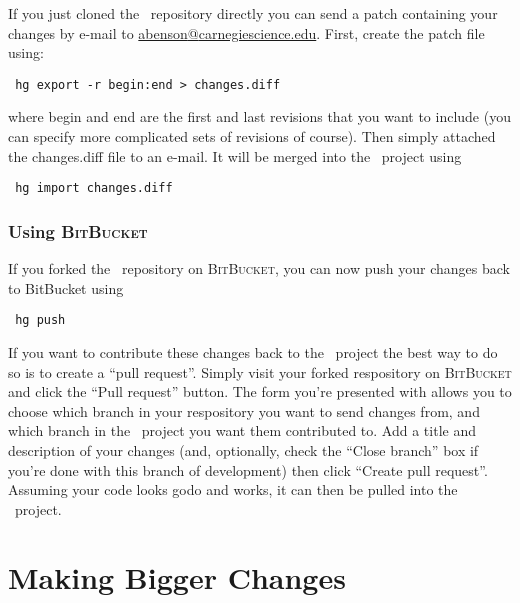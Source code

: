 If you just cloned the \glc\ repository directly you can send a patch containing your changes by e-mail to \href{mailto:abenson@carnegiescience.edu}{abenson{@}carnegiescience.edu}. First, create the patch file using:
\begin{verbatim}
 hg export -r begin:end > changes.diff
\end{verbatim}
where {\normalfont \ttfamily begin} and {\normalfont \ttfamily end} are the first and last revisions that you want to include (you can specify more complicated sets of revisions of course). Then simply attached the {\normalfont \ttfamily changes.diff} file to an e-mail. It will be merged into the \glc\ project using
\begin{verbatim}
 hg import changes.diff
\end{verbatim}

\subsubsection{Using {\normalfont \scshape BitBucket}}

If you forked the \glc\ repository on {\normalfont \scshape BitBucket}, you can now push your changes back to {\normalfont \ttfamily BitBucket} using
\begin{verbatim}
 hg push
\end{verbatim}
If you want to contribute these changes back to the \glc\ project the best way to do so is to create a ``pull request''. Simply visit your forked respository on {\normalfont \scshape BitBucket} and click the ``Pull request'' button. The form you're presented with allows you to choose which branch in your respository you want to send changes from, and which branch in the \glc\ project you want them contributed to. Add a title and description of your changes (and, optionally, check the ``Close branch'' box if you're done with this branch of development) then click ``Create pull request''. Assuming your code looks godo and works, it can then be pulled into the \glc\ project.

\section{Making Bigger Changes}

